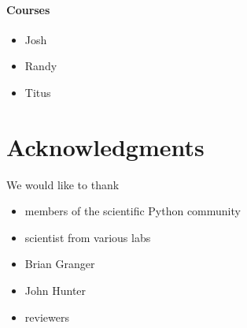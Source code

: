 \documentclass[ChapterTOCs,krantz2]{krantz} %
\begin{document}
\paragraph{ {\bf Courses}}

\begin{itemize}

\item Josh

\item Randy

\item Titus

\end{itemize}


\section*{Acknowledgments}
We would like to thank
\begin{itemize}
\item members of the scientific Python community
\item scientist from various labs
\item Brian Granger
\item John Hunter
\item reviewers
\end{itemize}



\end{document}
